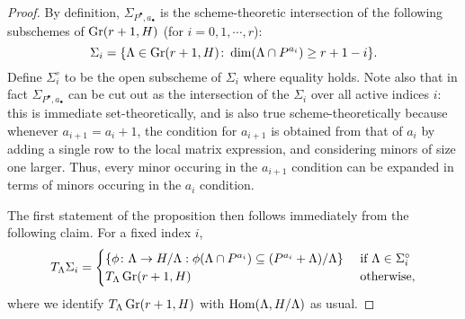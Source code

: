 \documentclass{amsart}
\begin{document}
\begin{proof}
By definition, $\Sigma_{P^{\bullet},a_{\bullet}}$ is the scheme-theoretic intersection 
of the following subschemes of $\operatorname{Gr}(r+1,H)$ (for $i=0,1,\cdots,r$):
$$\Sigma_i = \{ \Lambda \in \operatorname{Gr}(r+1,H)\colon \dim(\Lambda \cap P^{a_i}) \geq
r+1-i \}.$$
Define $\Sigma_i^\circ$ to be the open subscheme of $\Sigma_i$ where equality
holds. Note also that in fact
$\Sigma_{P^{\bullet},a_{\bullet}}$ can be cut out as the intersection of the
$\Sigma_i$ over all active indices $i$: this is immediate set-theoretically,
and is also true scheme-theoretically because whenever $a_{i+1}=a_i+1$,
the condition for $a_{i+1}$ is obtained from that of $a_i$ by adding a 
single row to the local matrix expression, and considering minors of
size one larger. Thus, every minor occuring in the $a_{i+1}$ condition can be 
expanded in terms of minors occuring in the $a_i$ condition.

The first statement of the proposition then follows immediately from the
following claim. For a fixed index $i$,
$$ T_{\Lambda} \Sigma_i =
\begin{cases}
\{\phi\colon \Lambda\to H/\Lambda: \phi(\Lambda \cap P^{a_i}) \subseteq
(P^{a_i}+\Lambda)/\Lambda \} & \mbox{ if $\Lambda \in \Sigma^\circ_i$}\\
T_{\Lambda} \operatorname{Gr}(r+1,H) & \mbox{ otherwise,}
\end{cases}$$
where we identify $T_\Lambda \operatorname{Gr}(r+1,H)$ with $\operatorname{Hom}(\Lambda,H/\Lambda)$ as
usual.


\end{proof}
\end{document}
